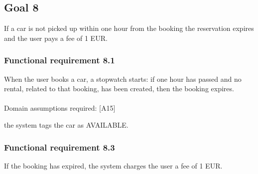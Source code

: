 \subsection{Goal 8}
If a car is not picked up within one hour from the booking the reservation expires and the user pays a fee of 1 EUR.

\setcounter{secnumdepth}{3}
\subsubsection{Functional requirement 8.1}
When the user books a car, a stopwatch starts: if one hour has passed and no rental, related to that booking, has been created, then the booking expires.\\~\\
\noindent Domain assumptions required: [A15]

 the system tags the car as AVAILABLE.

\subsubsection{Functional requirement 8.3}
 If the booking has expired, the system charges the user a fee of 1 EUR.